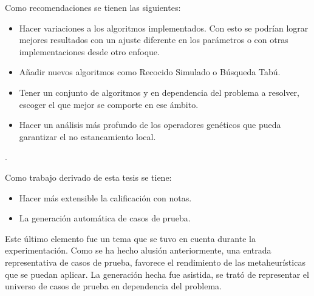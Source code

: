 \documentclass[a4paper,openright,11pt,oneside]{book}
\begin{document}
	Como recomendaciones se tienen las siguientes:
	\begin{itemize}
		
		\item Hacer variaciones a los algoritmos implementados. Con esto se podrían lograr mejores resultados con un ajuste diferente en los parámetros o con otras implementaciones desde otro enfoque.
		
		\item Añadir nuevos algoritmos como Recocido Simulado o Búsqueda Tabú.
		
		\item Tener un conjunto de algoritmos y en dependencia del problema a resolver, escoger el que mejor se comporte en ese ámbito.
		
		\item Hacer un análisis más profundo de los operadores genéticos que pueda garantizar el no estancamiento local.
		
	\end{itemize}. 
	
	Como trabajo derivado de esta tesis se tiene:
	\begin{itemize}
		
		\item Hacer más extensible la calificación con notas.
		
		\item La generación automática de casos de prueba.
		
	\end{itemize}

	Este último elemento fue un tema que se tuvo en cuenta durante la experimentación. Como se ha hecho alusión anteriormente, una entrada representativa de casos de prueba, favorece el rendimiento de las metaheurísticas que se puedan aplicar. La generación hecha fue asistida, se trató de representar el universo de casos de prueba en dependencia del problema.
	



\end{document}
